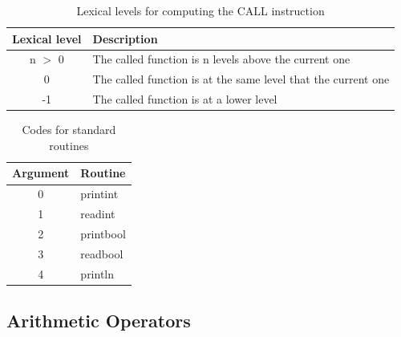 \documentclass[a4paper, 11pt]{report}
\begin{document}
\begin{table}[htb]
\center
\begin{tabular}{|c|l|}
 \hline
 Lexical level & Description\\
 \hline\hline
 n $>$ 0 & The called function is n levels above the current one\\ 
 0 & The called function is at the same level that the current one\\
 -1 & The called function is at a lower level\\
 \hline
\end{tabular}
\caption{Lexical levels for computing the CALL instruction}
\label{tbl:levels}
\end{table}

\begin{table}[htb]
\center
\begin{tabular}{|c|l|}
 \hline
 Argument & Routine\\
 \hline\hline
 0 & printint\\ 
 1 & readint\\ 
 2 & printbool\\ 
 3 & readbool\\ 
 4 & println\\ 
 \hline
\end{tabular}
\caption{Codes for standard routines}
\label{tbl:callargs}
\end{table}


\subsection{Arithmetic Operators}
\end{document}
